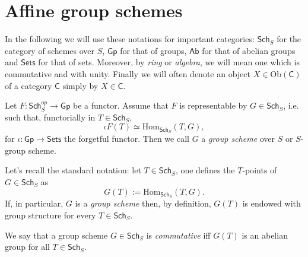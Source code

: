 \documentclass[../Main]{subfiles}
\begin{document}
\chapter{Affine group schemes}
In the following we will use these notations for important categories:
$\mathsf{Sch}_{S}$ for the category of schemes over $S$,
$\mathsf{Gp}$ for that of groups,
$\mathsf{Ab}$ for that of abelian groups
and $\mathsf{Sets}$ for that of sets.
Moreover, by {\em ring} or {\em algebra}, we will mean one which is commutative and with unity.
Finally we will often denote an object $X \in \mathrm{Ob} \left(\mathsf{C}\right)$ 
of a category $\mathsf{C}$ simply by $X \in \mathsf{C}$.
\begin{defn}
	Let $F\colon \mathsf{Sch}_S^{op} \to \mathsf{Gp}$ be a functor.
	Assume that $F$ is representable by $G \in \mathsf{Sch}_{ S }$, i.e. such that, 
	functorially in $T \in \mathsf{Sch}_{ S }$,
	\begin{equation}
		\iota F(T) \simeq \mathrm{Hom}_{\mathsf{Sch}_S} \left( T, G \right)
	,\end{equation} 
	for $\iota\colon \mathsf{Gp} \to \mathsf{Sets}$ the forgetful functor.
	Then we call $G$ a {\em group scheme} over $S$
	or $S$-group scheme.
\end{defn}

\begin{rem}
	Let's recall the standard notation: let $T \in \mathsf{Sch}_{ S }$, one defines
	the $T$-points of $G \in \mathsf{Sch}_{ S }$ as
	\begin{equation}
		G(T) := \mathrm{Hom}_{\mathsf{Sch}_{ S }} \left( T, G \right)
	.\end{equation} 
	If, in particular, $G$ is a {\em group scheme} then, by definition,
	$G(T)$ is endowed with group structure for every $T \in \mathsf{Sch}_{ S }$.
\end{rem}

\begin{defn}
	We say that a group scheme $G \in \mathsf{Sch}_{ S }$ is {\em commutative}
	iff $G(T)$ is an abelian group for all $T \in \mathsf{Sch}_{ S }$.
\end{defn}
\end{document}
